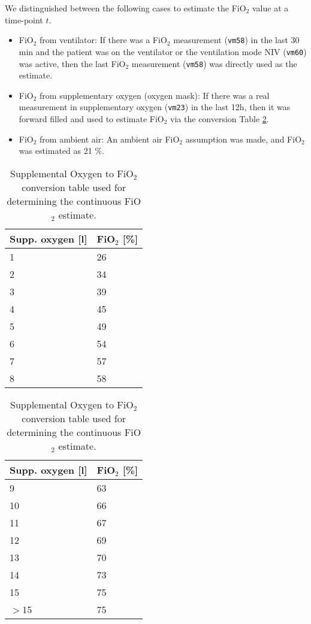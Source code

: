 \documentclass{article}
\begin{document}
We distinguished between the following cases to estimate the FiO$_2$ value at a time-point $t$. 

\begin{itemize}
    \item FiO$_2$ from ventilator: If there was a FiO$_2$ measurement (\texttt{vm58}) in the last 30 min and the patient was on the ventilator or the ventilation mode NIV (\texttt{vm60}) was active, then the last FiO$_2$ measurement (\texttt{vm58}) was directly used as the estimate.
    \item FiO$_2$ from supplementary oxygen (oxygen mask): If there was a real measurement in supplementary oxygen (\texttt{vm23}) in the last 12h, then it was forward filled and used to estimate FiO$_2$ via the conversion Table     \ref{tab:appendix-suppox-conv-table}.
    \item FiO$_2$ from ambient air: An ambient air FiO$_2$ assumption was made,
    and FiO$_2$ was estimated as 21 \%.
\end{itemize}

\begin{table}[!ht]
    \caption{ Supplemental Oxygen to FiO$_2$ conversion table used for determining the continuous FiO$_2$ estimate.}
    \label{tab:appendix-suppox-conv-table}
    \begin{center}
        {\selectfont\small
            \begin{tabular}{ll}
                \toprule
                \textbf{Supp. oxygen [l]} & \textbf{FiO$_2$ [\%]} \\
                \midrule
                1  & 26 \\
                2 & 34 \\
                3 & 39 \\
                4 & 45 \\
                5 & 49 \\
                6 & 54 \\
                7 & 57 \\
                8 & 58 \\
                \bottomrule
            \end{tabular}
            \begin{tabular}{ll}
                \toprule
                \textbf{Supp. oxygen [l]} & \textbf{FiO$_2$ [\%]} \\
                \midrule
                9 & 63 \\
                10 & 66 \\
                11 & 67 \\
                12 & 69 \\
                13 & 70 \\
                14 & 73 \\
                15 & 75 \\
                $>$15 & 75 \\
                \bottomrule
            \end{tabular}}
    \end{center}
\end{table}
\FloatBarrier
\end{document}
